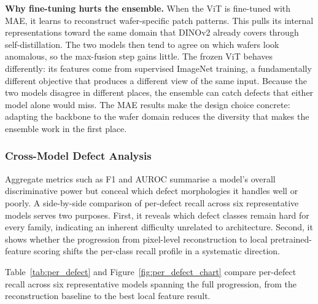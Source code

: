 \documentclass[11pt]{article}
\begin{document}
\textbf{Why fine-tuning hurts the ensemble.} When the ViT is fine-tuned with MAE, it learns to reconstruct wafer-specific patch patterns. This pulls its internal representations toward the same domain that DINOv2 already covers through self-distillation. The two models then tend to agree on which wafers look anomalous, so the max-fusion step gains little. The frozen ViT behaves differently: its features come from supervised ImageNet training, a fundamentally different objective that produces a different view of the same input. Because the two models disagree in different places, the ensemble can catch defects that either model alone would miss. The MAE results make the design choice concrete: adapting the backbone to the wafer domain reduces the diversity that makes the ensemble work in the first place.

\subsubsection{Cross-Model Defect Analysis}

Aggregate metrics such as F1 and AUROC summarise a model's overall discriminative power but conceal which defect morphologies it handles well or poorly.
A side-by-side comparison of per-defect recall across six representative models serves two purposes.
First, it reveals which defect classes remain hard for every family, indicating an inherent difficulty unrelated to architecture.
Second, it shows whether the progression from pixel-level reconstruction to local pretrained-feature scoring shifts the per-class recall profile in a systematic direction.

Table~\ref{tab:per_defect} and Figure~\ref{fig:per_defect_chart} compare
per-defect recall across six representative models spanning the full
progression, from the reconstruction baseline to the best local feature result.
\end{document}
